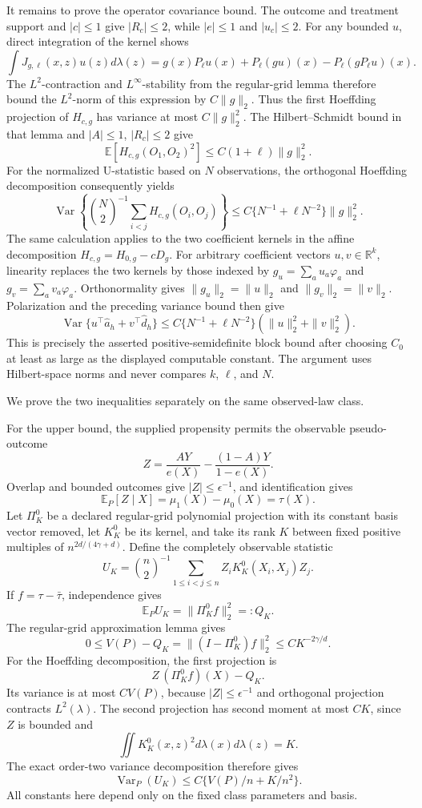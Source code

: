 It remains to prove the operator covariance bound.  The outcome and treatment support and \(|c|\le1\) give \(|R_c|\le2\), while \(|e|\le1\) and \(|u_c|\le2\).  For any bounded \(u\), direct integration of the kernel shows
\[
 \int J_{g,\ell}(x,z)u(z)d\lambda(z)
 =g(x)P_\ell u(x)+P_\ell(gu)(x)-P_\ell(gP_\ell u)(x).
\]
The \(L^2\)-contraction and \(L^\infty\)-stability from the regular-grid lemma therefore bound the \(L^2\)-norm of this expression by \(C\|g\|_2\).  Thus the first Hoeffding projection of \(H_{c,g}\) has variance at most \(C\|g\|_2^2\).  The Hilbert--Schmidt bound in that lemma and \(|A|\le1\), \(|R_c|\le2\) give
\[
 \mathbb E[H_{c,g}(O_1,O_2)^2]\le C(1+\ell)\|g\|_2^2.
\]
For the normalized U-statistic based on \(N\) observations, the orthogonal Hoeffding decomposition consequently yields
\[
 \operatorname{Var}\!\left\{\binom N2^{-1}\sum_{i<j}H_{c,g}(O_i,O_j)\right\}
 \le C\{N^{-1}+\ell N^{-2}\}\|g\|_2^2.
\]
The same calculation applies to the two coefficient kernels in the affine decomposition \(H_{c,g}=H_{0,g}-cD_g\).  For arbitrary coefficient vectors \(u,v\in\mathbb R^k\), linearity replaces the two kernels by those indexed by \(g_u=\sum_a u_a\varphi_a\) and \(g_v=\sum_a v_a\varphi_a\).  Orthonormality gives \(\|g_u\|_2=\|u\|_2\) and \(\|g_v\|_2=\|v\|_2\).  Polarization and the preceding variance bound then give
\[
 \operatorname{Var}\{u^\top\widehat a_h+v^\top\widehat d_h\}
 \le C\{N^{-1}+\ell N^{-2}\}(\|u\|_2^2+\|v\|_2^2).
\]
 This is precisely the asserted positive-semidefinite block bound after choosing \(C_0\) at least as large as the displayed computable constant.  The argument uses Hilbert-space norms and never compares \(k\), \(\ell\), and \(N\).

We prove the two inequalities separately on the same observed-law class.

For the upper bound, the supplied propensity permits the observable pseudo-outcome
\[
 Z=\frac{AY}{e(X)}-\frac{(1-A)Y}{1-e(X)}.
\]
Overlap and bounded outcomes give \(|Z|\le\epsilon^{-1}\), and identification gives
\[
 \mathbb E_P[Z\mid X]
 =\mu_1(X)-\mu_0(X)=\tau(X).
\]
Let \(\Pi_K^0\) be a declared regular-grid polynomial projection with its constant basis vector removed, let \(K_K^0\) be its kernel, and take its rank \(K\) between fixed positive multiples of \(n^{2d/(4\gamma+d)}\).  Define the completely observable statistic
\[
 U_K=\binom n2^{-1}\sum_{1\le i<j\le n}
 Z_iK_K^0(X_i,X_j)Z_j.
\]
If \(f=\tau-\bar\tau\), independence gives
\[
 \mathbb E_PU_K=\|\Pi_K^0f\|_2^2=:Q_K.
\]
The regular-grid approximation lemma gives
\[
 0\le V(P)-Q_K=\|(I-\Pi_K^0)f\|_2^2
 \le C K^{-2\gamma/d}.
\]
For the Hoeffding decomposition, the first projection is
\[
 Z\,(\Pi_K^0f)(X)-Q_K.
\]
Its variance is at most \(C V(P)\), because \(|Z|\le\epsilon^{-1}\) and orthogonal projection contracts \(L^2(\lambda)\).  The second projection has second moment at most \(CK\), since \(Z\) is bounded and
\[
 \iint K_K^0(x,z)^2d\lambda(x)d\lambda(z)=K.
\]
The exact order-two variance decomposition therefore gives
\[
 \operatorname{Var}_P(U_K)\le C\{V(P)/n+K/n^2\}. \tag{1}
\]
All constants here depend only on the fixed class parameters and basis.

